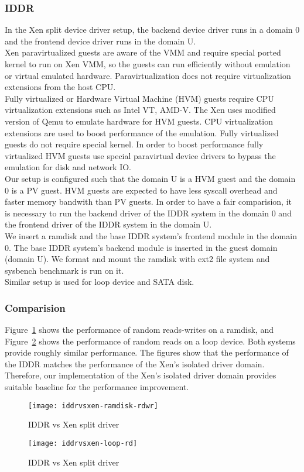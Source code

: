 \subsubsection*{IDDR}
In the Xen split device driver setup, the backend device driver runs in a domain 0 and the frontend device driver runs in the domain U. 
\\[3mm]
Xen paravirtualized guests are aware of the VMM and require special ported kernel to run on Xen VMM, so the guests can run efficiently without emulation or virtual emulated hardware. Paravirtualization does not require virtualization extensions from the host CPU. 
\\[3mm]
Fully virtualized or Hardware Virtual Machine (HVM) guests require CPU virtualization extensions such as Intel VT, AMD-V. The Xen uses modified version of Qemu to emulate hardware for HVM guests. CPU virtualization extensions are used to boost performance of the emulation. Fully virtualized guests do not require special kernel. In order to boost performance fully virtualized HVM guests use special paravirtual device drivers to bypass the emulation for disk and network IO.
\\[3mm]
Our setup is configured such that the domain U is a HVM guest and the domain 0 is a PV guest. HVM guests are expected to have less syscall overhead and faster memory bandwith than PV guests. In order to have a fair comparision, it is necessary to run the backend driver of the IDDR system in the domain 0 and the frontend driver of the IDDR system in the domain U.
\\[3mm]
We insert a ramdisk and the base IDDR system's frontend module in the domain 0. The base IDDR system's backend module is inserted in the guest domain (domain U). We format and mount the ramdisk with ext2 file system and sysbench benchmark is run on it.  
\\[3mm]
Similar setup is used for loop device and SATA disk.
\subsubsection*{Comparision}
Figure~\ref{fig:iddrvsxen-ramdisk-rdwr} shows the performance of random reads-writes on a ramdisk, and Figure~\ref{fig:iddrvsxen-loop-rd} shows the performance of random reads on a loop device. Both systems provide roughly similar performance. The figures show that the performance of the IDDR matches the performance of the Xen's isolated driver domain. Therefore, our implementation of the Xen's isolated driver domain provides suitable baseline for the performance improvement.
\begin{figure}[!ht]
\centering
\texttt{[image: iddrvsxen-ramdisk-rdwr]}
\caption{IDDR vs Xen split driver}
\label{fig:iddrvsxen-ramdisk-rdwr}
\end{figure}
\begin{figure}[!ht]
\centering
\texttt{[image: iddrvsxen-loop-rd]}
\caption{IDDR vs Xen split driver}
\label{fig:iddrvsxen-loop-rd}
\end{figure}


